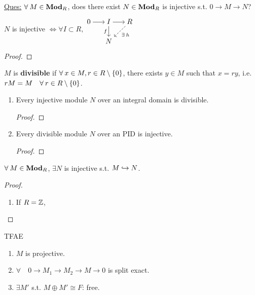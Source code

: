 \underline{Ques:} $\forall M \in \Mod_R$, does there exist $N \in \mathbf{Mod}_R$ is
injective s.t. $0 \to M \to N$?

\begin{theorem}
  $N$ is injective $\iff \forall I \subset R,$
  $\begin{tikzcd}[cramped, sep=15pt]
    0 \ar[r] & I \ar[d, "f"'] \ar[r] & R \ar[dashed, dl, "\exists h"] \\
     & N
  \end{tikzcd}$
  \begin{proof}
  \end{proof}
\end{theorem}

\begin{definition}
  $M$ is {\bf divisible} if $\forall x\in M, r \in R \setminus \set{0}$, there exists
  $y \in M$ such that $x = ry$, i.e. $rM = M \quad \forall r \in R \setminus \set{0}$.
\end{definition}

\begin{prop} \mbox{}
  \begin{enumerate}
    \item Every injective module $N$ over an integral domain is divisible.
      \begin{proof}
      \end{proof}
    \item Every divisible module $N$ over an PID is injective.
      \begin{proof}
      \end{proof}
  \end{enumerate}
\end{prop}

\begin{theorem}
 $\forall M \in \Mod_R$, $\exists N$ is injective s.t. $M \hookrightarrow N$.

 \begin{proof}
   \begin{enumerate}
     \item If $R = \mathbb{Z}$,
   \end{enumerate}
 \end{proof}
\end{theorem}

\begin{prop}
  TFAE
  \begin{enumerate}
    \item $M$ is projective.
    \item $\forall \quad 0 \to M_1 \to M_2 \to M \to 0$ is split exact.
    \item $\exists M'$ s.t. $M \oplus M' \cong F$: free.
  \end{enumerate}
\end{prop}

